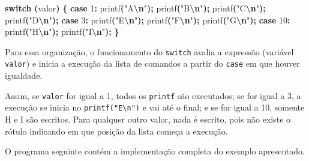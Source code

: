 \documentclass[
  11pt,
  a4paper,
]{scrbook}
\newenvironment{Shaded}{\begin{snugshade}}{\end{snugshade}}
\newcommand{\ControlFlowTok}[1]{\textcolor[rgb]{0.13,0.29,0.53}{\textbf{#1}}}
\newcommand{\DecValTok}[1]{\textcolor[rgb]{0.00,0.00,0.81}{#1}}
\newcommand{\NormalTok}[1]{#1}
\newcommand{\OperatorTok}[1]{\textcolor[rgb]{0.81,0.36,0.00}{\textbf{#1}}}
\newcommand{\SpecialCharTok}[1]{\textcolor[rgb]{0.81,0.36,0.00}{\textbf{#1}}}
\newcommand{\StringTok}[1]{\textcolor[rgb]{0.31,0.60,0.02}{#1}}
\begin{document}
\begin{Shaded}
\begin{Highlighting}[]
    \ControlFlowTok{switch} \OperatorTok{(}\NormalTok{valor}\OperatorTok{)} \OperatorTok{\{}
        \ControlFlowTok{case} \DecValTok{1}\OperatorTok{:}
\NormalTok{            printf}\OperatorTok{(}\StringTok{"A}\SpecialCharTok{\textbackslash{}n}\StringTok{"}\OperatorTok{);}
\NormalTok{            printf}\OperatorTok{(}\StringTok{"B}\SpecialCharTok{\textbackslash{}n}\StringTok{"}\OperatorTok{);}
\NormalTok{            printf}\OperatorTok{(}\StringTok{"C}\SpecialCharTok{\textbackslash{}n}\StringTok{"}\OperatorTok{);}
\NormalTok{            printf}\OperatorTok{(}\StringTok{"D}\SpecialCharTok{\textbackslash{}n}\StringTok{"}\OperatorTok{);}
        \ControlFlowTok{case} \DecValTok{3}\OperatorTok{:}
\NormalTok{            printf}\OperatorTok{(}\StringTok{"E}\SpecialCharTok{\textbackslash{}n}\StringTok{"}\OperatorTok{);}
\NormalTok{            printf}\OperatorTok{(}\StringTok{"F}\SpecialCharTok{\textbackslash{}n}\StringTok{"}\OperatorTok{);}
\NormalTok{            printf}\OperatorTok{(}\StringTok{"G}\SpecialCharTok{\textbackslash{}n}\StringTok{"}\OperatorTok{);}
        \ControlFlowTok{case} \DecValTok{10}\OperatorTok{:}
\NormalTok{            printf}\OperatorTok{(}\StringTok{"H}\SpecialCharTok{\textbackslash{}n}\StringTok{"}\OperatorTok{);}
\NormalTok{            printf}\OperatorTok{(}\StringTok{"I}\SpecialCharTok{\textbackslash{}n}\StringTok{"}\OperatorTok{);}
    \OperatorTok{\}}
\end{Highlighting}
\end{Shaded}

Para essa organização, o funcionamento do \texttt{switch} avalia a
expressão (variável \texttt{valor}) e inicia a execução da lista de
comandos a partir do \texttt{case} em que houver igualdade.

Assim, se \texttt{valor} for igual a 1, todos os \texttt{printf} são
executados; se for igual a 3, a execução se inicia no
\texttt{printf("E\textbackslash{}n")} e vai até o final; e se for igual
a 10, somente H e I são escritos. Para qualquer outro valor, nada é
escrito, pois não existe o rótulo indicando em que posição da lista
começa a execução.

O programa seguinte contém a implementação completa do exemplo
apresentado.
\end{document}
